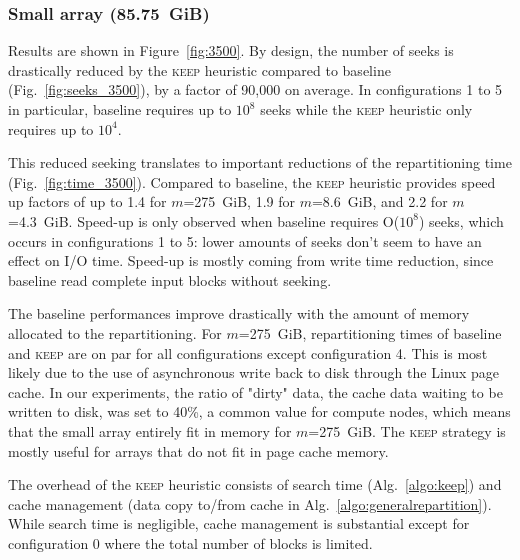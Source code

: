 \documentclass[sigconf, nonacm]{acmart}
\newcommand{\keep}[0]{\textsc{keep}\xspace}
\begin{document}
\subsubsection{Small array (85.75~GiB)}

Results are shown in Figure~\ref{fig:3500}.
By design, the number of seeks is drastically reduced by the \keep
heuristic compared to baseline (Fig.~\ref{fig:seeks_3500}), by a factor of
90,000 on average. In configurations 1 to 5 in particular, baseline
requires up to $10^8$ seeks while the \keep heuristic only requires up to
$10^4$.

This reduced seeking translates to important reductions of the
repartitioning time (Fig.~\ref{fig:time_3500}). Compared to baseline, the
\keep heuristic provides speed up factors of up to 1.4 for
$m$=275~GiB, 1.9 for $m$=8.6~GiB, and 2.2 for $m$=4.3~GiB.
Speed-up is only observed when baseline requires O($10^8$) seeks, which occurs
in configurations 1 to 5: lower amounts of seeks don't seem to have an effect on
I/O time. Speed-up is mostly coming from write time reduction, since
baseline read complete input blocks without seeking.



The baseline performances improve drastically with the amount of memory
allocated to the repartitioning. For $m$=275~GiB, repartitioning times of
baseline and \keep are on par for all configurations except configuration
4. This is most likely due to the use of asynchronous write back to disk
through the Linux page cache. In our experiments, the ratio of "dirty"
data, the cache data waiting to be written to disk, was set to 40\%, a
common value for compute nodes, which means that the small array entirely
fit in memory for $m$=275~GiB. The \keep strategy is mostly useful for
arrays that do not fit in page cache memory.

The overhead of the \keep heuristic consists of search time
(Alg.~\ref{algo:keep}) and cache management (data copy to/from cache in
Alg.~\ref{algo:generalrepartition}). While search time is negligible, cache
management is substantial except for configuration 0 where the total number
of blocks is limited.
\end{document}
